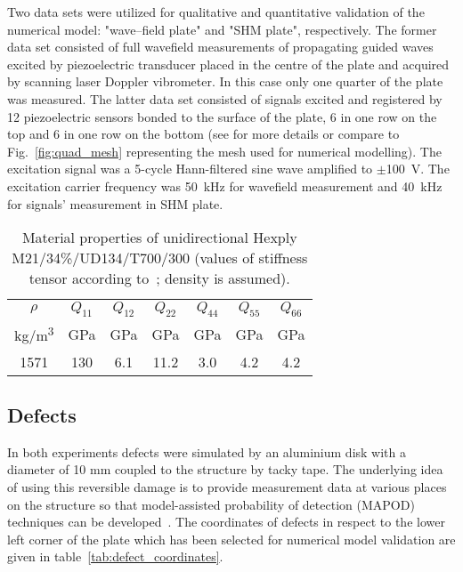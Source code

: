 \documentclass[preprint,12pt]{elsarticle}
\begin{document}
	Two data sets were utilized for qualitative and quantitative validation of the numerical model: "wave--field plate" and "SHM plate", respectively. The former data set consisted of full wavefield measurements of propagating guided waves excited by piezoelectric transducer placed in the centre of the plate and acquired by scanning laser Doppler vibrometer. In this case only one quarter of the plate was measured. The latter data set consisted of signals excited and registered by 12 piezoelectric sensors bonded to the surface of the plate, 6 in one row on the top and 6 in one row on the bottom (see \cite{Moll2018} for more details or compare to Fig.~\ref{fig:quad_mesh} representing the mesh used for numerical modelling). The excitation signal was a 5-cycle Hann-filtered sine wave amplified to $\pm$100~V. The excitation carrier frequency was 50~kHz for wavefield measurement and 40~kHz for signals' measurement in SHM plate.
	\begin{table}
		\renewcommand{\arraystretch}{1.3}
		\centering \footnotesize
		\caption{Material properties of unidirectional Hexply M21/34\%/UD134/T700/300 (values of stiffness tensor according to~\cite{Moll2018}; density is assumed).}
		\begin{tabular}{ccccccc} 
			\toprule
			$\rho$ & $Q_{11}$ & $Q_{12}$  & $Q_{22}$ & $Q_{44}$ & $Q_{55}$ & $Q_{66}$\\
			kg/m\textsuperscript{3} &GPa& GPa  & GPa  & GPa& GPa & GPa\\ 
			\midrule
			1571 &130& 6.1& 11.2 & 3.0 & 4.2 & 4.2\\
			\bottomrule 
		\end{tabular} 
		\label{tab:mat_prop}
	\end{table}
	\subsection{Defects}
	In both experiments defects were simulated by an aluminium disk with a diameter of 10 mm coupled to the structure by tacky tape. The underlying idea of using this reversible damage is to provide measurement data at various places on the structure so that model-assisted probability of detection (MAPOD) techniques can be developed~\cite{Eckstein2012}. The coordinates of defects in respect to the lower left corner of the plate which has been selected for numerical model validation are given in table~\ref{tab:defect_coordinates}.
	
\end{document}
